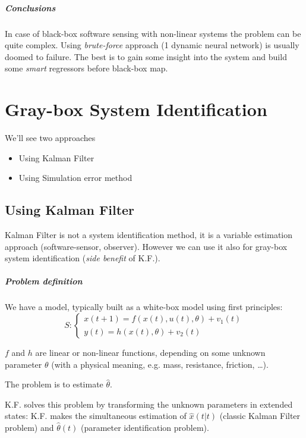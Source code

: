 
\paragraph{Conclusions} In case of black-box software sensing with non-linear systems the problem can be quite complex.
Using \emph{brute-force} approach (1 dynamic neural network) is usually doomed to failure.
The best is to gain some insight into the system and build some \emph{smart} regressors before black-box map.

\chapter{Gray-box System Identification}

We'll see two approaches
\begin{itemize}
    \item Using Kalman Filter
    \item Using Simulation error method
\end{itemize}

\section{Using Kalman Filter}
Kalman Filter is not a system identification method, it is a variable estimation approach (software-sensor, observer).
However we can use it also for gray-box system identification (\emph{side benefit} of K.F.).

\paragraph{Problem definition} We have a model, typically built as a white-box model using first principles:
\[
    S: \begin{cases}
        x(t+1) = f(x(t), u(t), \theta) + v_1(t) \\
        y(t) = h(x(t), \theta) + v_2(t)
    \end{cases}
\]

$f$ and $h$ are linear or non-linear functions, depending on some unknown parameter $\theta$ (with a physical meaning, e.g. mass, resistance, friction, \dots).

The problem is to estimate $\hat{\theta}$.

K.F. solves this problem by transforming the unknown parameters in extended states: K.F. makes the simultaneous estimation of $\hat{x}(t|t)$ (classic Kalman Filter problem) and $\hat{\theta}(t)$ (parameter identification problem).

